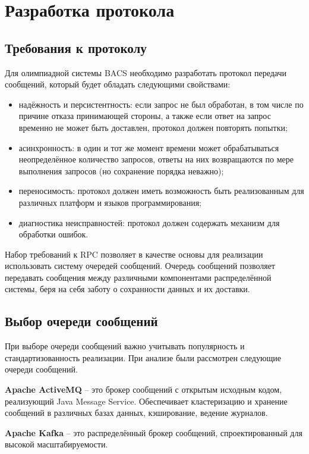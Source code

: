 \section{Разработка протокола}
\subsection{Требования к протоколу}
Для олимпиадной системы BACS необходимо разработать протокол передачи сообщений,
который будет обладать следующими свойствами:
\begin{itemize}
    \item надёжность и персистентность:
        если запрос не был обработан, в том числе по причине отказа
        принимающей стороны, а также если ответ на запрос временно
        не может быть доставлен, протокол должен повторять попытки;
    \item асинхронность: в один и тот же момент времени может обрабатываться
        неопределённое количество запросов, ответы на них возвращаются
        по мере выполнения запросов (но сохранение порядка неважно);
    \item переносимость: протокол должен иметь возможность быть реализованным
        для различных платформ и языков программирования;
    \item диагностика неисправностей: протокол должен содержать механизм
        для обработки ошибок.
\end{itemize}

Набор требований к RPC позволяет в качестве основы для реализации использовать
систему очередей сообщений. Очередь сообщений позволяет передавать
сообщения между различными компонентами распределённой системы, беря на себя
заботу о сохранности данных и их доставки.

\subsection{Выбор очереди сообщений}
При выборе очереди сообщений важно учитывать популярность и стандартизованность
реализации. При анализе были рассмотрен следующие очереди сообщений.

\textbf{Apache ActiveMQ} -- это брокер сообщений с открытым исходным кодом,
реализующий Java Message Service. Обеспечивает кластеризацию и хранение
сообщений в различных базах данных, кэширование, ведение журналов.

\textbf{Apache Kafka} -- это распределённый брокер сообщений, спроектированный
для высокой масштабируемости.


